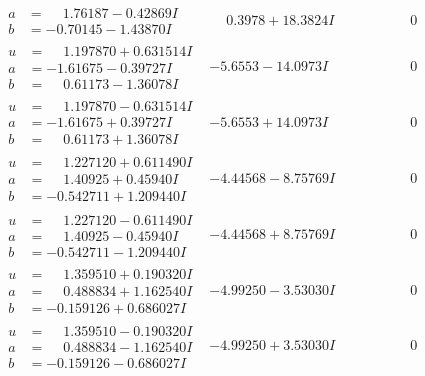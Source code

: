 \documentclass[1p]{elsarticle_modified}
\theoremstyle{definition}
\begin{document}
$$\begin{array}{c|c|c}
\begin{aligned}
a &= \phantom{-}1.76187 - 0.42869 I \\
b &= -0.70145 - 1.43870 I\end{aligned}
 & \phantom{-}0.3978 + 18.3824 I & \phantom{-0.000000 } 0 \\ \hline\begin{aligned}
u &= \phantom{-}1.197870 + 0.631514 I \\
a &= -1.61675 - 0.39727 I \\
b &= \phantom{-}0.61173 - 1.36078 I\end{aligned}
 & -5.6553 - 14.0973 I & \phantom{-0.000000 } 0 \\ \hline\begin{aligned}
u &= \phantom{-}1.197870 - 0.631514 I \\
a &= -1.61675 + 0.39727 I \\
b &= \phantom{-}0.61173 + 1.36078 I\end{aligned}
 & -5.6553 + 14.0973 I & \phantom{-0.000000 } 0 \\ \hline\begin{aligned}
u &= \phantom{-}1.227120 + 0.611490 I \\
a &= \phantom{-}1.40925 + 0.45940 I \\
b &= -0.542711 + 1.209440 I\end{aligned}
 & -4.44568 - 8.75769 I & \phantom{-0.000000 } 0 \\ \hline\begin{aligned}
u &= \phantom{-}1.227120 - 0.611490 I \\
a &= \phantom{-}1.40925 - 0.45940 I \\
b &= -0.542711 - 1.209440 I\end{aligned}
 & -4.44568 + 8.75769 I & \phantom{-0.000000 } 0 \\ \hline\begin{aligned}
u &= \phantom{-}1.359510 + 0.190320 I \\
a &= \phantom{-}0.488834 + 1.162540 I \\
b &= -0.159126 + 0.686027 I\end{aligned}
 & -4.99250 - 3.53030 I & \phantom{-0.000000 } 0 \\ \hline\begin{aligned}
u &= \phantom{-}1.359510 - 0.190320 I \\
a &= \phantom{-}0.488834 - 1.162540 I \\
b &= -0.159126 - 0.686027 I\end{aligned}
 & -4.99250 + 3.53030 I & \phantom{-0.000000 } 0 \\ \hline\begin{aligned}

\end{aligned}
\end{array}$$
\end{document}
